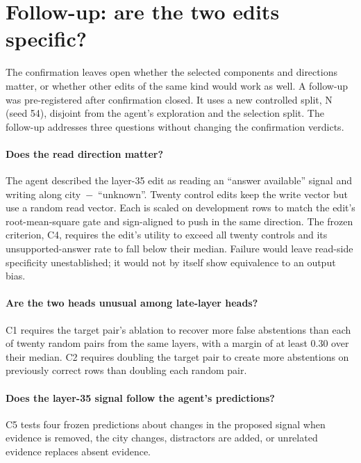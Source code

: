 \section{Follow-up: are the two edits specific?}
\label{sec:followup}


The confirmation leaves open whether the selected components and directions matter, or whether other edits
of the same kind would work as well. A follow-up was pre-registered after confirmation closed. It uses a new
controlled split, N (seed 54), disjoint from the agent's exploration and the selection split. The follow-up
addresses three questions without changing the confirmation verdicts.

\paragraph{Does the read direction matter?}
The agent described the layer-35 edit as reading an ``answer available'' signal and writing along
city~$-$~``unknown''. Twenty control edits keep the write vector but use a random read vector. Each is scaled
on development rows to match the edit's root-mean-square gate and sign-aligned to push in the same direction.
The frozen criterion, C4, requires the edit's utility to exceed all twenty controls and its unsupported-answer
rate to fall below their median. Failure would leave read-side specificity unestablished; it would not by
itself show equivalence to an output bias.

\paragraph{Are the two heads unusual among late-layer heads?}
C1 requires the target pair's ablation to recover more false abstentions than each of twenty random pairs
from the same layers, with a margin of at least 0.30 over their median. C2 requires doubling the target
pair to create more abstentions on previously correct rows than doubling each random pair.

\paragraph{Does the layer-35 signal follow the agent's predictions?}
C5 tests four frozen predictions about changes in the proposed signal when evidence is removed, the city
changes, distractors are added, or unrelated evidence replaces absent evidence.

